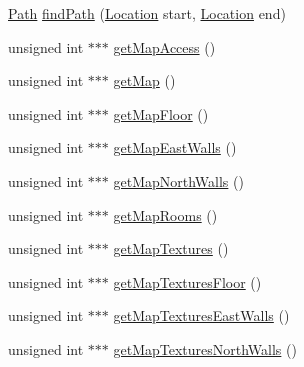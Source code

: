 \begin{DoxyCompactItemize}
\item 
\hyperlink{classPath}{Path} \hyperlink{classShipMap_ac66dd983ca92d5e3d0696f2a25da90e1}{find\-Path} (\hyperlink{structLocation}{Location} start, \hyperlink{structLocation}{Location} end)
\item 
unsigned int $\ast$$\ast$$\ast$ \hyperlink{classShipMap_a2281c139f8f1d4a9023cbfc7a8ebc5f9}{get\-Map\-Access} ()
\item 
unsigned int $\ast$$\ast$$\ast$ \hyperlink{classShipMap_abde984e7f9b9172965e58157981857ae}{get\-Map} ()
\item 
unsigned int $\ast$$\ast$$\ast$ \hyperlink{classShipMap_a5ab9f1b8d8a8efb91dbc1555ddd835da}{get\-Map\-Floor} ()
\item 
unsigned int $\ast$$\ast$$\ast$ \hyperlink{classShipMap_a2272771cebf1ad7459d87108bcce9fa8}{get\-Map\-East\-Walls} ()
\item 
unsigned int $\ast$$\ast$$\ast$ \hyperlink{classShipMap_a85804cf36ce82bbcc1722732deaea2f5}{get\-Map\-North\-Walls} ()
\item 
unsigned int $\ast$$\ast$$\ast$ \hyperlink{classShipMap_a96d0a84da234e73df2d0a44531da71e7}{get\-Map\-Rooms} ()
\item 
unsigned int $\ast$$\ast$$\ast$ \hyperlink{classShipMap_a4de11bdb01a85083627dc41016967bce}{get\-Map\-Textures} ()
\item 
unsigned int $\ast$$\ast$$\ast$ \hyperlink{classShipMap_a3701cc7e75f89719e2c137203b3ada7f}{get\-Map\-Textures\-Floor} ()
\item 
unsigned int $\ast$$\ast$$\ast$ \hyperlink{classShipMap_a6b16ec5869e5cb347d847c975b3fd01f}{get\-Map\-Textures\-East\-Walls} ()
\item 
unsigned int $\ast$$\ast$$\ast$ \hyperlink{classShipMap_aecdbc1ca649c823dc139aefcce416ebb}{get\-Map\-Textures\-North\-Walls} ()
\end{DoxyCompactItemize}


